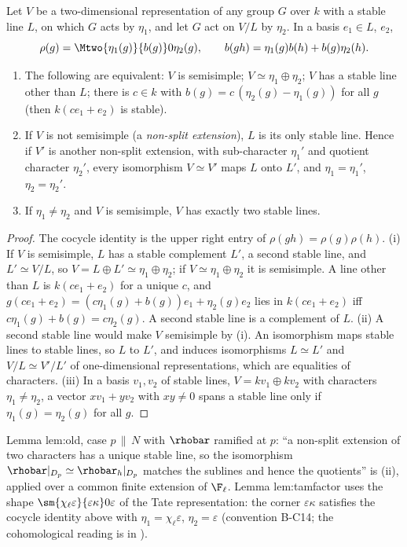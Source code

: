 \begin{proposition}\label{prop:reps:nonsplit-line}
Let $V$ be a two-dimensional representation of any group $G$ over $k$ with a stable line $L$, on which $G$ acts by $\eta_1$, and let $G$
act on $V/L$ by $\eta_2$. In a basis $e_1\in L$, $e_2$,
\[
\rho(g)=\Mtwo{\eta_1(g)}{b(g)}0{\eta_2(g)},\qquad b(gh)=\eta_1(g)b(h)+b(g)\eta_2(h).
\]
\begin{enumerate}[label=(\roman*)]
\item The following are equivalent: $V$ is semisimple; $V\simeq\eta_1\oplus\eta_2$; $V$ has a stable line other than $L$; there is $c\in k$ with
$b(g)=c\,(\eta_2(g)-\eta_1(g))$ for all $g$ (then $k(ce_1+e_2)$ is stable).
\item If $V$ is not semisimple (a \emph{non-split extension}), $L$ is its only stable line. Hence if $V'$ is another non-split extension,
with sub-character $\eta_1'$ and quotient character $\eta_2'$, every isomorphism $V\simeq V'$ maps $L$ onto $L'$, and $\eta_1=\eta_1'$, $\eta_2=\eta_2'$.
\item If $\eta_1\ne\eta_2$ and $V$ is semisimple, $V$ has exactly two stable lines.
\end{enumerate}
\end{proposition}

\begin{proof}
The cocycle identity is the upper right entry of $\rho(gh)=\rho(g)\rho(h)$.
(i) If $V$ is semisimple, $L$ has a stable complement $L'$, a second stable line, and $L'\simeq V/L$, so $V=L\oplus L'\simeq\eta_1\oplus\eta_2$; if
$V\simeq\eta_1\oplus\eta_2$ it is semisimple. A line other than $L$ is $k(ce_1+e_2)$ for a unique $c$, and
$g(ce_1+e_2)=(c\eta_1(g)+b(g))e_1+\eta_2(g)e_2$ lies in $k(ce_1+e_2)$ iff $c\eta_1(g)+b(g)=c\eta_2(g)$. A second stable line is a complement of $L$.
(ii) A second stable line would make $V$ semisimple by (i). An isomorphism maps stable lines to stable lines, so $L$ to $L'$, and
induces isomorphisms $L\simeq L'$ and $V/L\simeq V'/L'$ of one-dimensional representations, which are equalities of characters.
(iii) In a basis $v_1,v_2$ of stable lines, $V=kv_1\oplus kv_2$ with characters $\eta_1\ne\eta_2$, a vector $xv_1+yv_2$ with $xy\ne0$ spans a stable line only if
$\eta_1(g)=\eta_2(g)$ for all $g$.
\end{proof}

\begin{paperlink}
Lemma lem:old, case $p\,\|\,N$ with $\rhobar$ ramified at $p$: ``a non-split extension of two characters has a unique stable line, so the
isomorphism $\rhobar|_{D_p}\simeq\rhobar_h|_{D_p}$ matches the sublines and hence the quotients'' is (ii), applied over a common finite extension
of $\F_\ell$. Lemma lem:tamfactor uses the shape $\sm{\chi_\ell\varepsilon}{\varepsilon\kappa}0\varepsilon$ of the Tate representation: the corner
$\varepsilon\kappa$ satisfies the cocycle identity above with $\eta_1=\chi_\ell\varepsilon$, $\eta_2=\varepsilon$ (convention B-C14; the cohomological reading is in
).
\end{paperlink}

